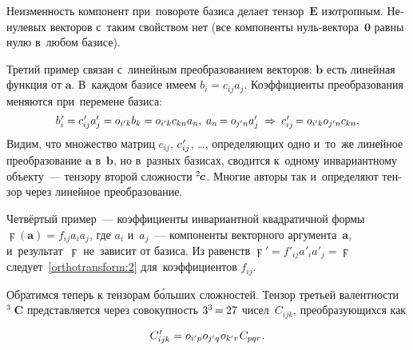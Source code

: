 \begin{otherlanguage}{russian}
Неизменность компонент при~повороте базиса делает тензор~${\bm{E}}$ изотропным. Ненулевых векторов с~таким свойством нет (все компоненты нуль\hbox{-}вектора~$\bm{0}$ равны нулю в~любом базисе).

Третий пример связан с~линейным преобразованием векторов: ${\bm{b}}$ есть линейная функция от ${\bm{a}}$. В~каждом базисе имеем ${b_i = c_{ij} a_j}$. Коэффициенты преобразования меняются при~перемене базиса:
\[
\scalebox{0.96}[1]{$b\hspace{0.16ex}'_{\hspace{-0.16ex}i} = c\hspace{0.16ex}'_{\hspace{-0.16ex}ij} a'_j = \cosinematrix{i'k} b_k = \cosinematrix{i'k} c_{kn} a_n ,\;
a_n \hspace{-0.25ex} = \cosinematrix{j'n} a'_j \;\Rightarrow\; c\hspace{0.16ex}'_{\hspace{-0.16ex}ij} \hspace{-0.2ex} = \cosinematrix{i'k} \cosinematrix{j'n} c_{kn}$}.
\]
\noindent Видим, что множество матриц ${c_{ij}}$, ${c\hspace{0.16ex}'_{\hspace{-0.16ex}ij}}$, \dots, определяющих одно и~то~же линейное преобразование ${\bm{a}}$ в~${\bm{b}}$, но в~разных базисах, сводится к~одному инвариантному объекту~--- тензору второй сложности ${\hspace{-0.1ex} ^2\hspace{-0.2ex}\bm{c}}$. Многие авторы так и~определяют тензор через линейное преобразование.

Четвёртый пример~--- коэффициенты инвариантной квадратичной формы ${\digamma(\bm{a}) = f_{ij} a_i a_j}$, где ${a_i}$ и~${a_j}$~--- компоненты векторного аргумента~${\bm{a}}$, и~результат~${\digamma}$ не~зависит от базиса. Из равенств ${\digamma' = f'_{ij} a'_i a'_j = \digamma}$ следует~\eqref{orthotransform:2} для~коэффициентов ${f_{ij}}$.

Обратимся теперь к тензорам б\'{о}льших сложностей. Тензор третьей валентности ${^3\!\!\;\bm{C}}$ представляется через совокупность ${3^3 \hspace{-0.24ex}=\hspace{-0.12ex} 27}$ чисел~${C_{ijk}}$, преобразующихся как

\nopagebreak\vspace{-0.1em}\begin{equation}\label{orthotransform:3}
C\hspace{0.16ex}'_{\hspace{-0.32ex}ijk}
= o_{i'p} \hspace{.1ex} o_{j'q} \hspace{.1ex} o_{k'r} \hspace{.16ex} C_{pqr}
\hspace{.1ex} .
\end{equation}


\end{otherlanguage}
